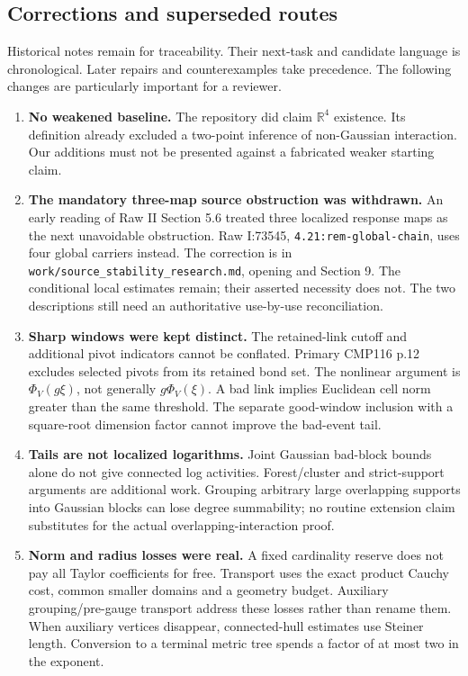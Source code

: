 \documentclass[11pt]{article}
\providecommand{\hrbpath}[1]{\nolinkurl{#1}}
\theoremstyle{remark}
\begin{document}
\subsection{Corrections and superseded routes}
\label{hrb-corrections}

Historical notes remain for traceability.
Their next-task and candidate language
is chronological. Later repairs and
counterexamples take precedence.
The following changes are particularly
important for a reviewer.

\begin{enumerate}
\item \textbf{No weakened baseline.}
The repository did claim \(\mathbb R^4\)
existence. Its definition already
excluded a two-point inference of
non-Gaussian interaction. Our additions
must not be presented against a
fabricated weaker starting claim.

\item \textbf{The mandatory three-map
source obstruction was withdrawn.}
An early reading of Raw II Section 5.6
treated three localized response maps
as the next unavoidable obstruction.
Raw I:73545,
\hrbpath{4.21:rem-global-chain},
uses four global carriers instead.
The correction is in
\hrbpath{work/source_stability_research.md},
opening and Section 9.
The conditional local estimates remain;
their asserted necessity does not.
The two descriptions still need an
authoritative use-by-use reconciliation.

\item \textbf{Sharp windows were kept
distinct.}
The retained-link cutoff and additional
pivot indicators cannot be conflated.
Primary CMP116 p.12 excludes selected
pivots from its retained bond set.
The nonlinear argument is \(\Phi_V(g\xi)\),
not generally \(g\Phi_V(\xi)\).
A bad link implies Euclidean cell norm
greater than the same threshold.
The separate good-window inclusion
with a square-root dimension factor
cannot improve the bad-event tail.

\item \textbf{Tails are not localized
logarithms.}
Joint Gaussian bad-block bounds alone
do not give connected log activities.
Forest/cluster and strict-support
arguments are additional work.
Grouping arbitrary large overlapping
supports into Gaussian blocks can
lose degree summability; no routine
extension claim substitutes for the
actual overlapping-interaction proof.

\item \textbf{Norm and radius losses
were real.}
A fixed cardinality reserve does not
pay all Taylor coefficients for free.
Transport uses the exact product
Cauchy cost, common smaller domains
and a geometry budget. Auxiliary
grouping/pre-gauge transport address
these losses rather than rename them.
When auxiliary vertices disappear,
connected-hull estimates use Steiner
length. Conversion to a terminal
metric tree spends a factor of at
most two in the exponent.


\end{enumerate}
\end{document}
